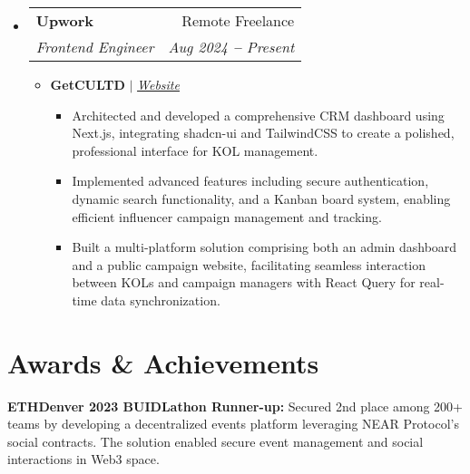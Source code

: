 \documentclass[a4paper,11pt]{article}
\makeatletter
\newcommand{\resumeItem}[1]{
  \item\small{
    {#1 \vspace{-2pt}}
  }
}
\newcommand{\resumeSubheading}[4]{
  \vspace{-2pt}\item
    \begin{tabular*}{0.97\textwidth}[t]{l@{\extracolsep{\fill}}r}
      \textbf{#1} & #2 \\
      \textit{\small#3} & \textit{\small #4} \\
    \end{tabular*}\vspace{-7pt}
}
\newcommand{\resumeSubHeadingListStart}{\begin{itemize}[leftmargin=0.15in, label={}]}
\newcommand{\resumeSubHeadingListEnd}{\end{itemize}}
\newcommand{\resumeItemListStart}{\begin{itemize}}
\newcommand{\resumeItemListEnd}{\end{itemize}\vspace{-5pt}}
\makeatother
\begin{document}
\resumeSubHeadingListStart
\resumeSubheading
{Upwork}{Remote Freelance}
{Frontend Engineer}{Aug 2024 \textbf{--} Present}
\resumeItemListStart
\resumeItem{\textbf{GetCULTD} $|$ \emph{\href{https://app.getcultd.com}{\color{blue}Website}}
 \resumeItemListStart
 \resumeItem{
   Architected and developed a comprehensive CRM dashboard using Next.js, integrating shadcn-ui and TailwindCSS to create a polished, professional interface for KOL management.}
 \resumeItem{
   Implemented advanced features including secure authentication, dynamic search functionality, and a Kanban board system, enabling efficient influencer campaign management and tracking.}
 \resumeItem{
   Built a multi-platform solution comprising both an admin dashboard and a public campaign website, facilitating seamless interaction between KOLs and campaign managers with React Query for real-time data synchronization.}
 \resumeItemListEnd
}
\resumeItemListEnd
\resumeSubHeadingListEnd


\section{Awards \& Achievements}
\vspace{2pt}
\resumeSubHeadingListStart
\small{\item{
   \textbf{ETHDenver 2023 BUIDLathon Runner-up:} Secured 2nd place among 200+ teams by developing a decentralized events platform leveraging NEAR Protocol's social contracts. The solution enabled secure event management and social interactions in Web3 space. \\ \vspace{3pt}
}}
\resumeSubHeadingListEnd
\end{document}

